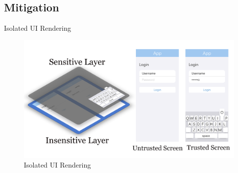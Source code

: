 \documentclass{beamer}
\begin{document}
\subsection{Mitigation}
\begin{frame}{Isolated UI Rendering}
	\begin{figure}
		\centering
		\includegraphics[width=\linewidth]{Figs/isolated_ui.png}
		\caption*{Isolated UI Rendering}
	\end{figure}
\end{frame}
\end{document}
